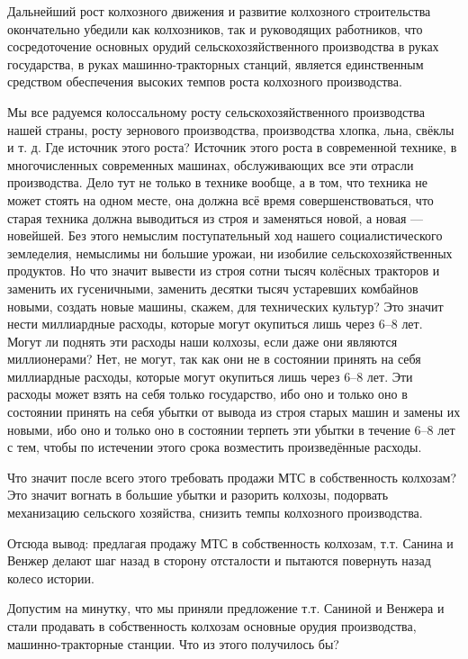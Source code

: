 \documentclass[12pt, a4paper, openany]{book}
\begin{document}
Дальнейший рост колхозного движения и развитие колхозного строительства окончательно убедили как колхозников, так и руководящих работников, что сосредоточение основных орудий сельскохозяйственного производства в руках государства, в руках машинно-тракторных станций, является единственным средством обеспечения высоких темпов роста колхозного производства.



Мы все радуемся колоссальному росту сельскохозяйственного производства нашей страны, росту зернового производства, производства хлопка, льна, свёклы и т. д. Где источник этого роста? Источник этого роста в современной технике, в многочисленных современных машинах, обслуживающих все эти отрасли производства. Дело тут не только в технике вообще, а в том, что техника не может стоять на одном месте, она должна всё время совершенствоваться, что старая техника должна выводиться из строя и заменяться новой, а новая — новейшей. Без этого немыслим поступательный ход нашего социалистического земледелия, немыслимы ни большие урожаи, ни изобилие сельскохозяйственных продуктов. Но что значит вывести из строя сотни тысяч колёсных тракторов и заменить их гусеничными, заменить десятки тысяч устаревших комбайнов новыми, создать новые машины, скажем, для технических культур? Это значит нести миллиардные расходы, которые могут окупиться лишь через 6–8 лет. Могут ли поднять эти расходы наши колхозы, если даже они являются миллионерами? Нет, не могут, так как они не в состоянии принять на себя миллиардные расходы, которые могут окупиться лишь через 6–8 лет. Эти расходы может взять на себя только государство, ибо оно и только оно в состоянии принять на себя убытки от вывода из строя старых машин и замены их новыми, ибо оно и только оно в состоянии терпеть эти убытки в течение 6–8 лет с тем, чтобы по истечении этого срока возместить произведённые расходы.

Что значит после всего этого требовать продажи МТС в собственность колхозам? Это значит вогнать в большие убытки и разорить колхозы, подорвать механизацию сельского хозяйства, снизить темпы колхозного производства.

Отсюда вывод: предлагая продажу МТС в собственность колхозам, т.т. Санина и Венжер делают шаг назад в сторону отсталости и пытаются повернуть назад колесо истории.

Допустим на минутку, что мы приняли предложение т.т. Саниной и Венжера и стали продавать в собственность колхозам основные орудия производства, машинно-тракторные станции. Что из этого получилось бы?
\end{document}
